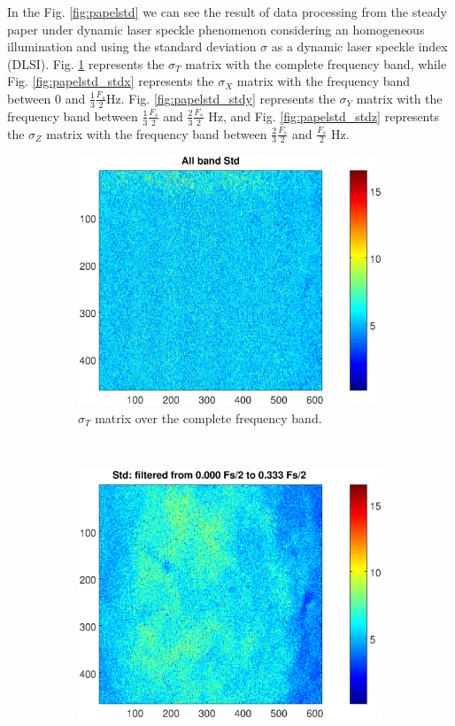 \documentclass[review]{elsarticle}
\begin{document}
In the Fig. \ref{fig:papelstd} we can see the result of data processing from the steady
 paper under dynamic laser speckle phenomenon considering an homogeneous illumination and using the standard deviation $\sigma$ as a dynamic laser speckle index (DLSI). Fig. \ref{fig:papelall}
represents the $\sigma_T$ matrix with the complete frequency band, while Fig. \ref{fig:papelstd_stdx}
represents the $\sigma_X$ matrix with the frequency band between $0$ and $\frac{1}{3}\frac{F_s}{2}$Hz.
Fig. \ref{fig:papelstd_stdy} represents the $\sigma_Y$ matrix with the frequency band between $\frac{1}{3}\frac{F_s}{2}$ and $\frac{2}{3}\frac{F_s}{2}$ Hz, and Fig. \ref{fig:papelstd_stdz} 
represents the $\sigma_Z$ matrix with the frequency band between $\frac{2}{3}\frac{F_s}{2}$ and $\frac{F_s}{2}$ Hz.
\begin{figure}[h!]
    \centering
    \begin{subfigure}[b]{0.485\textwidth}
        \includegraphics[width=\textwidth]{stdall.eps}
	\caption{$\sigma_T$ matrix over the complete frequency band.}
        \label{fig:papelall}
    \end{subfigure}
    ~
    \begin{subfigure}[b]{0.465\textwidth}
        \includegraphics[width=\textwidth]{stdx.eps}

\end{subfigure}
\end{figure}
\end{document}
